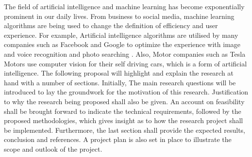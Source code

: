 
The field of artificial intelligence and machine learning has become exponentially prominent in our daily lives.
From business to social media, machine learning algorithms are being used to change the definition of efficiency and user experience.
For example, Artificial intelligence algorithms are utilised by many companies such as Facebook and Google to optimize the experience
with image and voice recognition and photo searching \citep{adit}. Also, Motor companies such as Tesla Motors use computer vision for their self 
driving cars, which is a form of artificial intelligence. 
The following proposal will highlight and explain the research at hand with a number of sections. Initially, The main research questions 
will be introduced to lay the groundwork for the motivation of this research. Justification to why the research being proposed shall also be given.
An account on feasibility shall be brought forward to indicate the technical requirements, followed by the proposed methodologies, which gives insight as 
to how the research project shall be implemented. Furthermore, the last section shall provide the expected results, conclusion and references. A project plan is also set in
place to illustrate the scope and outlook of the project.
